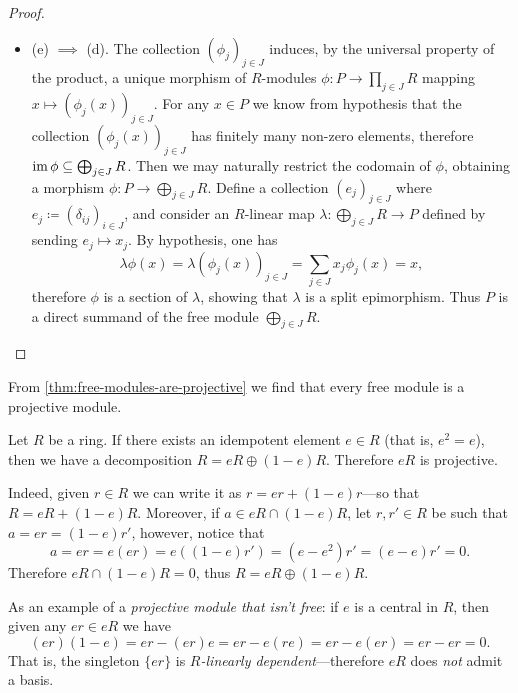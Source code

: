\begin{proof}
\begin{itemize}
\item (e) \(\implies\) (d). The collection \((\phi_j)_{j \in J}\) induces, by
  the universal property of the product, a unique morphism of \(R\)-modules
  \(\phi: P \to \prod_{j \in J} R\) mapping \(x \mapsto (\phi_j(x))_{j \in
    J}\). For any \(x \in P\) we know from hypothesis that the collection
  \((\phi_j(x))_{j \in J}\) has finitely many non-zero elements, therefore
  \(\operatorname{im} \phi \subseteq \bigoplus_{j \in J} R\). Then we may naturally restrict
  the codomain of \(\phi\), obtaining a morphism
  \(\phi: P \to \bigoplus_{j \in J} R\). Define a collection \((e_j)_{j \in J}\)
  where \(e_j \coloneq (\delta_{ij})_{i \in J}\), and consider an \(R\)-linear
  map \(\lambda: \bigoplus_{j \in J} R \to P\) defined by sending
  \(e_j \mapsto x_j\). By hypothesis, one has
  \[
  \lambda \phi(x)
  = \lambda(\phi_j(x))_{j \in J}
  = \sum_{j \in J} x_j \phi_j(x)
  = x,
  \]
  therefore \(\phi\) is a section of \(\lambda\), showing that \(\lambda\) is a
  split epimorphism. Thus \(P\) is a direct summand of the free module
  \(\bigoplus_{j \in J} R\).
\end{itemize}
\end{proof}

\begin{example}
\label{exp:free-mod-is-projective}
From \cref{thm:free-modules-are-projective} we find that every free module is a
projective module.
\end{example}

\begin{example}
\label{exp:idempotent-ring-projective}
Let \(R\) be a ring. If there exists an idempotent element \(e \in R\) (that is,
\(e^2 = e\)), then we have a decomposition \(R = e R \oplus (1 - e)
R\). Therefore \(e R\) is projective.

Indeed, given \(r \in R\) we can write it as \(r = e r + (1 - e) r\)---so that
\(R = eR + (1 - e)R\). Moreover, if \(a \in eR \cap (1 - e)R\), let \(r, r' \in
R\) be such that \(a = e r = (1 - e) r'\), however, notice that
\[
a = e r = e (e r) = e ((1 - e) r') = (e - e^2) r' = (e - e) r' = 0.
\]
Therefore \(e R \cap (1 - e) R = 0\), thus \(R = eR \oplus (1 - e)R\).

As an example of a \emph{projective module that isn't free}: if \(e\) is a
central in \(R\), then given any \(e r \in e R\) we have
\[
(e r) (1 - e) = e r - (e r) e = e r - e (r e) = e r - e (e r)
= er - er = 0.
\]
That is, the singleton \(\{e r\}\) is \emph{\(R\)-linearly
  dependent}---therefore \(eR\) does \emph{not} admit a basis.
\end{example}

